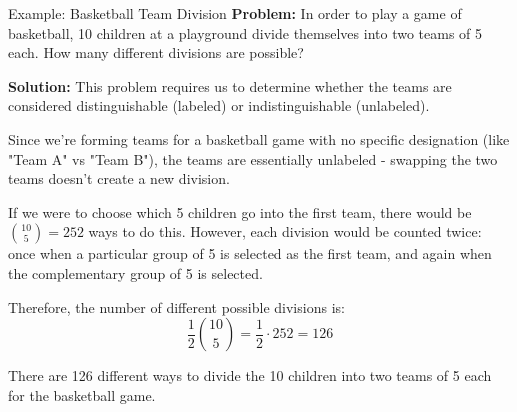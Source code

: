 \begin{exampleboxbreak}{Example: Basketball Team Division}
    \textbf{Problem:} In order to play a game of basketball, 10 children at a playground divide themselves into two teams of 5 each. How many different divisions are possible?

    \textbf{Solution:} This problem requires us to determine whether the teams are considered distinguishable (labeled) or indistinguishable (unlabeled).

    Since we're forming teams for a basketball game with no specific designation (like "Team A" vs "Team B"), the teams are essentially unlabeled - swapping the two teams doesn't create a new division.

    If we were to choose which 5 children go into the first team, there would be $\binom{10}{5} = 252$ ways to do this. However, each division would be counted twice: once when a particular group of 5 is selected as the first team, and again when the complementary group of 5 is selected.

    Therefore, the number of different possible divisions is:
    \[
    \frac{1}{2}\binom{10}{5} = \frac{1}{2} \cdot 252 = 126
    \]

    There are 126 different ways to divide the 10 children into two teams of 5 each for the basketball game.
\end{exampleboxbreak}

